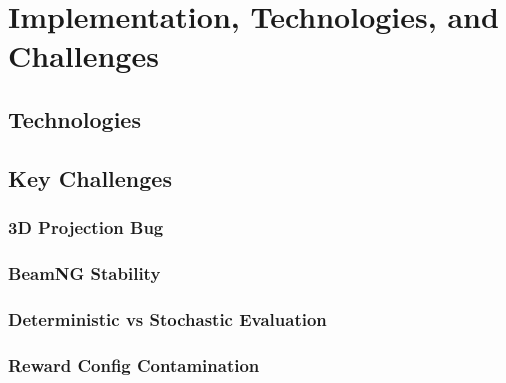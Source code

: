 \section{Implementation, Technologies, and Challenges}
\label{sec:implementation}


\subsection{Technologies}

\subsection{Key Challenges}

\subsubsection{3D Projection Bug}

\subsubsection{BeamNG Stability}

\subsubsection{Deterministic vs Stochastic Evaluation}

\subsubsection{Reward Config Contamination}

